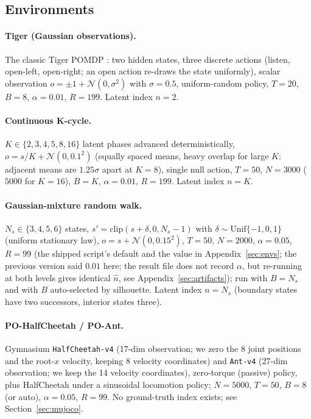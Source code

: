 \documentclass[10pt]{article}
\begin{document}
\subsection{Environments}

\paragraph{Tiger (Gaussian observations).}
The classic Tiger POMDP \citep{Kaelbling1998}: two hidden states, three discrete actions (listen, open-left, open-right; an
open action re-draws the state uniformly), scalar observation
$o=\pm1+\mathcal N(0,\sigma^2)$ with $\sigma=0.5$, uniform-random policy,
$T=20$, $B=8$, $\alpha=0.01$, $R=199$.  Latent index $n=2$.

\paragraph{Continuous K-cycle.}
$K\in\{2,3,4,5,8,16\}$ latent phases advanced deterministically,
$o=s/K+\mathcal N(0,0.1^2)$ (equally spaced means, heavy overlap for large
$K$: adjacent means are $1.25\sigma$ apart at $K=8$), single null action,
$T=50$, $N=3000$ ($5000$ for $K=16$), $B=K$, $\alpha=0.01$, $R=199$.  Latent
index $n=K$.

\paragraph{Gaussian-mixture random walk.}
$N_s\in\{3,4,5,6\}$ states, $s'=\mathrm{clip}(s+\delta,0,N_s{-}1)$ with
$\delta\sim\mathrm{Unif}\{-1,0,1\}$ (uniform stationary law),
$o=s+\mathcal N(0,0.15^2)$, $T=50$, $N=2000$, $\alpha=0.05$, $R=99$ (the shipped script's default and the value in Appendix~\ref{sec:envs}; the previous version said $0.01$ here; the result file does not record $\alpha$, but re-running at both levels gives identical $\hat n$, see Appendix~\ref{sec:artifacts}); run with
$B=N_s$ and with $B$ auto-selected by silhouette.  Latent index $n=N_s$
(boundary states have two successors, interior states three).

\paragraph{PO-HalfCheetah / PO-Ant.}
Gymnasium \texttt{HalfCheetah-v4} (17-dim observation; we zero the 8 joint
positions and the root-$x$ velocity, keeping 8 velocity coordinates) and
\texttt{Ant-v4} (27-dim observation; we keep the 14 velocity coordinates),
zero-torque (passive) policy, plus HalfCheetah under a sinusoidal locomotion
policy; $N=5000$, $T=50$, $B=8$ (or auto), $\alpha=0.05$, $R=99$.  No
ground-truth index exists; see Section~\ref{sec:mujoco}.
\end{document}
